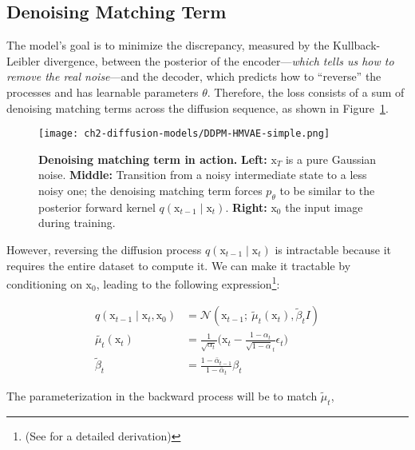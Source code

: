 \subsection{Denoising Matching Term}

The model's goal is to minimize the discrepancy, measured by the Kullback-Leibler divergence, between the posterior of the encoder---\textit{which tells us how to remove the real noise}---and the decoder, which predicts how to ``reverse'' the processes and has learnable parameters $\theta$. Therefore, the loss consists of a sum of denoising matching terms across the diffusion sequence, as shown in Figure~\ref{fig:ddpm-denoising-term}. \\

\begin{figure}[t]
  \centering
  \texttt{[image: ch2-diffusion-models/DDPM-HMVAE-simple.png]}
  \captionsetup{width=\textwidth} %
  \caption{\textbf{Denoising matching term in action.} \textbf{Left:} $\mathrm{x}_{T}$ is a pure Gaussian noise. \textbf{Middle:} Transition from a noisy intermediate state to a less noisy one; the denoising matching term forces $p_{\theta}$ to be similar to the posterior forward kernel $q(\mathrm{x}_{t-1}\mid \mathrm{x}_{t})$. \textbf{Right:} $\mathrm{x}_{0}$ the input image during training.}
  \label{fig:ddpm-denoising-term}
\end{figure}

\noindent However, reversing the diffusion process $q(\mathrm{x}_{t-1}\mid\mathrm{x}_{t})$ is intractable because it requires the entire dataset to compute it. We can make it tractable by conditioning on $\mathrm{x}_{0}$, leading to the following expression\footnote{(See \citep{weng2021diffusion} for a detailed derivation)}:

\begin{align}\label{eqn:reverse-forward-process}
    q(\mathrm{x}_{t-1}\mid\mathrm{x}_{t}, \mathrm{x}_{0}) &= \mathcal{N}(\mathrm{x}_{t-1};~\tilde{\mu}_{t}(\mathrm{x}_{t}), \tilde{\beta}_{t}I) \\
    \tilde{\mu_{t}}(\mathrm{x}_{t}) &= \frac{1}{\sqrt{\alpha_{t}}}\big(\mathrm{x}_{t} - \frac{1 - \alpha_{t}}{\sqrt{1 - \bar{\alpha}}_{t}}\epsilon_{t}\big) \\
    \tilde{\beta}_{t} &= \frac{1-\bar{\alpha}_{t-1}}{1-\bar{\alpha}_{t}}\beta_{t}
\end{align}

\noindent The parameterization in the backward process will be to match
$\tilde{\mu}_{t}$, 

